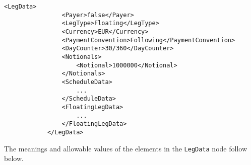 {\footnotesize
\begin{lstlisting}[caption=LegData, label=lst:leg_data]
            <LegData>
                <Payer>false</Payer>
                <LegType>Floating</LegType>
                <Currency>EUR</Currency>
                <PaymentConvention>Following</PaymentConvention>
                <DayCounter>30/360</DayCounter>
                <Notionals>
                    <Notional>1000000</Notional>
                </Notionals>
                <ScheduleData>
                	...
                </ScheduleData>
                <FloatingLegData>
                	...
                </FloatingLegData>
            </LegData>
\end{lstlisting}
}

The meanings and allowable values of the elements in the \lstinline!LegData! node follow below.

